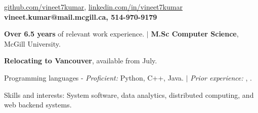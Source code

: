 \documentclass{resume} %
\begin{document}
\begin{hSubsection}
{
    \href{https://github.com/vineet7kumar}{github.com/vineet7kumar},
    \href{https://linkedin.com/in/vineet7kumar}{linkedin.com/in/vineet7kumar}
}
{
    \textbf{vineet.kumar@mail.mcgill.ca, 514-970-9179}
}
{%
}
\end{hSubsection}



\smallskip \smallskip 
\begin{rSection}{} \smallskip 
\begin{lSubsection} 
\item \textbf{Over 6.5 years} of relevant work experience.
        $\vert$ \textbf{M.Sc Computer Science}, McGill University. 
\item \textbf{Relocating to Vancouver}, available from July.
\item Programming languages - \emph{Proficient:} Python, C++, Java.
        $\vert$ \emph{Prior experience:} \xtenx, \matlabx.
\item Skills and interests: System software, data analytics, distributed
        computing, and web backend systems.
\end{lSubsection}
\end{rSection}
\end{document}
